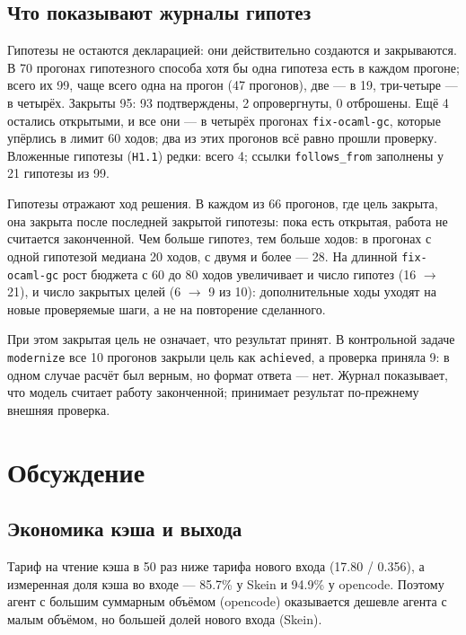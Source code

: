 \documentclass[11pt,a4paper]{article}
\begin{document}
\subsection{Что показывают журналы гипотез}
\label{sec:hyp-journals}

Гипотезы не остаются декларацией: они действительно создаются и закрываются. В 70 прогонах
гипотезного способа хотя бы одна гипотеза есть в каждом прогоне; всего их 99, чаще всего одна
на прогон (47 прогонов), две --- в 19, три-четыре --- в четырёх. Закрыты 95: 93 подтверждены,
2 опровергнуты, 0 отброшены. Ещё 4 остались открытыми, и все они --- в четырёх прогонах
\texttt{fix-ocaml-gc}, которые упёрлись в лимит 60 ходов; два из этих прогонов всё равно прошли
проверку. Вложенные гипотезы (\texttt{H1.1}) редки: всего 4; ссылки \texttt{follows\_from}
заполнены у 21 гипотезы из 99.

Гипотезы отражают ход решения. В каждом из 66 прогонов, где цель закрыта, она закрыта после
последней закрытой гипотезы: пока есть открытая, работа не считается законченной. Чем больше
гипотез, тем больше ходов: в прогонах с одной гипотезой медиана 20 ходов, с двумя и более ---
28. На длинной \texttt{fix-ocaml-gc} рост бюджета с 60 до 80 ходов увеличивает и число гипотез
(16 $\rightarrow$ 21), и число закрытых целей (6 $\rightarrow$ 9 из 10): дополнительные ходы
уходят на новые проверяемые шаги, а не на повторение сделанного.

При этом закрытая цель не означает, что результат принят. В контрольной задаче
\texttt{modernize} все 10 прогонов закрыли цель как \texttt{achieved}, а проверка приняла 9: в
одном случае расчёт был верным, но формат ответа --- нет. Журнал показывает, что модель считает
работу законченной; принимает результат по-прежнему внешняя проверка.

\section{Обсуждение}
\label{sec:discussion}

\subsection{Экономика кэша и выхода}

Тариф на чтение кэша в 50 раз ниже тарифа нового входа (17.80 / 0.356), а измеренная доля
кэша во входе --- 85.7\% у Skein и 94.9\% у opencode. Поэтому агент с большим суммарным
объёмом (opencode) оказывается дешевле агента с малым объёмом, но большей долей нового
входа (Skein).
\end{document}
